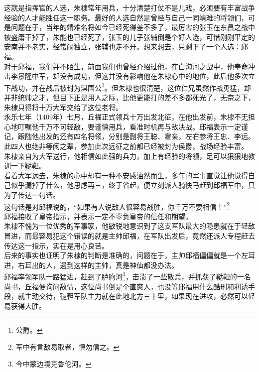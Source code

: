 \begin{multicols}{\theparacolNo}
这就是指挥官的人选，朱棣常年用兵，十分清楚打仗不是儿戏，必须要有丰富战争经验的人才能胜任这一职务。最好的人选自然是曾经与自己一同靖难的将领们，可是问题在于，当年的靖难名将如今已经死得差不多了，最厉害的张玉在东昌之战中被盛庸干掉了，朱能也已经死了，张玉的儿子张辅倒是个好人选，可惜刚刚平定的安南并不老实，经常闹独立，张辅也走不开。想来想去，只剩下了一个人选：邱福。\\

对于邱福，我们并不陌生，前面我们也曾经介绍过他，在白沟河之战中，他奉命冲击李景隆中军，却没有成功，但这并没有影响他在朱棣心中的地位，此后他多次立下战功，并在战后被封为淇国公\footnote{公爵。}。但朱棣也很清楚，这位仁兄虽然作战勇猛，却并非统帅之才，但目下正是用人之际，比他更能打的差不多都死光了，无奈之下，朱棣只得将十万大军交给了这位老将。\\

永乐七年（1409年）七月，丘福正式领兵十万出发北征，在他出发前，朱棣不无担心地叮嘱他千万不可轻敌，要谨慎用兵，看准时机再与敌决战。邱福表示一定谨记，跟随他出发的还有四名将领，分别是副将王聪、霍亲，左右参将王忠、李远。\\

此四人也绝非等闲之辈，参加此次远征之前都已经被封为侯爵，战场经验丰富。\\

朱棣亲自为大军送行，他相信如此强的兵力，加上有经验的将领，足可以狠狠地教训一下鞑靼。\\

看着大军远去，朱棣的心中却有一种不安感油然而生，多年的军事直觉让他觉得自己似乎漏掉了什么，他思虑再三，终于省起，便立刻派人骑快马赶到邱福军中，只为了传达一句话。\\

这句话是对邱福说的，“如果有人说敌人很容易战胜，你千万不要相信！”\footnote{军中有言敌易取者，慎勿信之。}\\

邱福接收了皇帝指示，并表示一定不辜负皇帝的信任和期望。\\

朱棣不愧为一位优秀的军事家，他敏锐地意识到了这支军队最大的隐患就在于轻敌冒进，而最容易犯这个错误的就是主帅邱福，在军队出发后，竟然还派人专程赶去传达这一指示，实在是用心良苦。\\

后来的事实也证明了朱棣的判断是准确的，问题在于，主帅邱福偏偏就是一个左耳进，右耳出的人，遇到这样的主帅，真是神仙都没办法。\\

邱福率领军队一路猛进，赶到了胪朐河\footnote{今中蒙边境克鲁伦河。}，击溃了一些散兵，并抓获了鞑靼的一名尚书，丘福便询问敌情，这位尚书倒是个直爽人，也没等邱福用什么酷刑和利诱手段，就主动交待，鞑靼军队主力就在此地北方三十里，如果现在进攻，必然可以轻易获得大胜。\\


\end{multicols}
